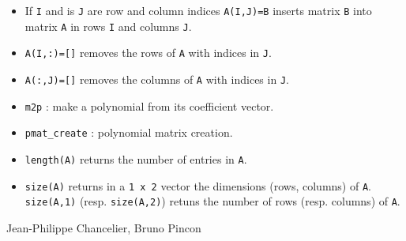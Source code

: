 \begin{itemize}
   \item If \verb+I+ and is \verb+J+ are row and column indices \verb+A(I,J)=B+ inserts
     matrix \verb+B+ into matrix \verb+A+ in rows \verb+I+ and columns \verb!J!.
   \item \verb+A(I,:)=[]+ removes the rows of \verb+A+ with indices in \verb+J+.
   \item \verb+A(:,J)=[]+ removes the columns of \verb+A+ with indices in \verb+J+.
\end{itemize}

\begin{itemize}
   \item \verb+m2p+ : make a polynomial from its coefficient vector.
   \item \verb+pmat_create+ : polynomial matrix creation.
   \item \verb+length(A)+ returns the number of entries in \verb+A+.
   \item \verb+size(A)+ returns in a \verb+1 x 2+ vector the dimensions (rows, columns)
     of \verb+A+. \verb+size(A,1)+ (resp. \verb+size(A,2)+) retuns the number of rows 
     (resp. columns) of \verb+A+.
\end{itemize}

\begin{manseealso}

\end{manseealso}

\begin{authors}
   Jean-Philippe Chancelier, Bruno Pincon
\end{authors}

